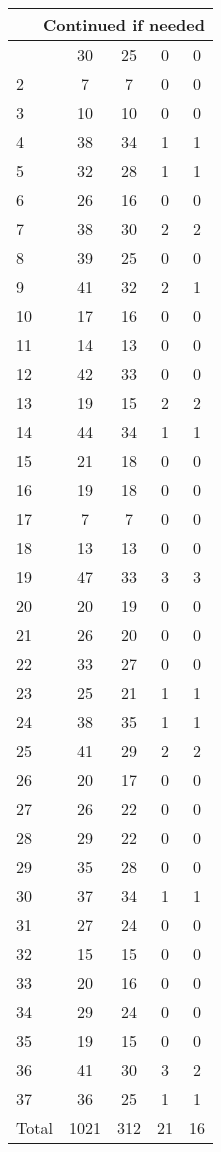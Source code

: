 \begin{center}
\begin{longtable}{l|c|c|c|c}
\hline \multicolumn{5}{|r|}{{Continued if needed}} \\ \hline
\endfoot 
1 & 30 & 25 & 0 & 0\\ \hline
2 & 7 & 7 & 0 & 0\\ \hline
3 & 10 & 10 & 0 & 0\\ \hline
4 & 38 & 34 & 1 & 1\\ \hline
5 & 32 & 28 & 1 & 1\\ \hline
6 & 26 & 16 & 0 & 0\\ \hline
7 & 38 & 30 & 2 & 2\\ \hline
8 & 39 & 25 & 0 & 0\\ \hline
9 & 41 & 32 & 2 & 1\\ \hline
10 & 17 & 16 & 0 & 0\\ \hline
11 & 14 & 13 & 0 & 0\\ \hline
12 & 42 & 33 & 0 & 0\\ \hline
13 & 19 & 15 & 2 & 2\\ \hline
14 & 44 & 34 & 1 & 1\\ \hline
15 & 21 & 18 & 0 & 0\\ \hline
16 & 19 & 18 & 0 & 0\\ \hline
17 & 7 & 7 & 0 & 0\\ \hline
18 & 13 & 13 & 0 & 0\\ \hline
19 & 47 & 33 & 3 & 3\\ \hline
20 & 20 & 19 & 0 & 0\\ \hline
21 & 26 & 20 & 0 & 0\\ \hline
22 & 33 & 27 & 0 & 0\\ \hline
23 & 25 & 21 & 1 & 1\\ \hline
24 & 38 & 35 & 1 & 1\\ \hline
25 & 41 & 29 & 2 & 2\\ \hline
26 & 20 & 17 & 0 & 0\\ \hline
27 & 26 & 22 & 0 & 0\\ \hline
28 & 29 & 22 & 0 & 0\\ \hline
29 & 35 & 28 & 0 & 0\\ \hline
30 & 37 & 34 & 1 & 1\\ \hline
31 & 27 & 24 & 0 & 0\\ \hline
32 & 15 & 15 & 0 & 0\\ \hline
33 & 20 & 16 & 0 & 0\\ \hline
34 & 29 & 24 & 0 & 0\\ \hline
35 & 19 & 15 & 0 & 0\\ \hline
36 & 41 & 30 & 3 & 2\\ \hline
37 & 36 & 25 & 1 & 1\\ \hline
\hline \hline
Total & 1021 & 312 & 21 & 16



\end{longtable}
\end{center}

